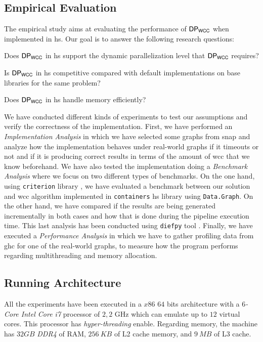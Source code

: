 \subsection{Empirical Evaluation}\label{sec:evaluation}
The empirical study aims at evaluating the performance of $\mathsf{DP_{WCC}}$ when implemented in \acrshort{hs}. 
Our goal is to answer the following research questions: 

\begin{inparaenum}[\bf {\bf RQ}1\upshape)]
\label{res:question}
    \item Does $\mathsf{DP_{WCC}}$ in \acrshort{hs} support the dynamic parallelization level that $\mathsf{DP_{WCC}}$ requires?
    \item Is $\mathsf{DP_{WCC}}$ in \acrshort{hs} competitive compared with default implementations on base libraries for the same problem?
    \item Does $\mathsf{DP_{WCC}}$ in \acrshort{hs} handle memory efficiently?
\end{inparaenum}

We have conducted different kinds of experiments to test our assumptions and verify the correctness of the implementation.
First, we have performed an \emph{Implementation Analysis} in which we have selected some graphs from \acrfull{snap} \cite{stanford} and analyze how the implementation behaves under real-world graphs if it timeouts or not and if it is producing correct results in terms of the amount of \acrshort{wcc} that we know beforehand.
We have also tested the implementation doing a \emph{Benchmark Analysis} where we focus on two different types of benchmarks. On the one hand, using \texttt{criterion} library \cite{criterion}, we have evaluated a benchmark between our solution and \acrshort{wcc} algorithm implemented in \texttt{containers} \acrshort{hs} library \cite{containers} using \texttt{Data.Graph}. On the other hand, we have compared if the results are being generated incrementally in both cases and how that is done during the pipeline execution time. This last analysis has been conducted using \texttt{diefpy} tool \cite{diefpaper,diefpy}.
Finally, we have executed a \textit{Performance Analysis} in which we have to gather profiling data from \acrfull{ghc} for one of the real-world graphs, to measure how the program performs regarding multithreading and memory allocation.

\subsection{Running Architecture}
All the experiments have been executed in a $x86$ $64$ bits architecture with a \textit{$6$-Core Intel Core i7} processor of $2,2$ GHz which can emulate up to $12$ virtual cores. This processor has \emph{hyper-threading} enable. Regarding memory, the machine has $32 GB$ \emph{DDR4} of RAM, $256\ KB$ of L2 cache memory, and $9\ MB$ of L3 cache.

